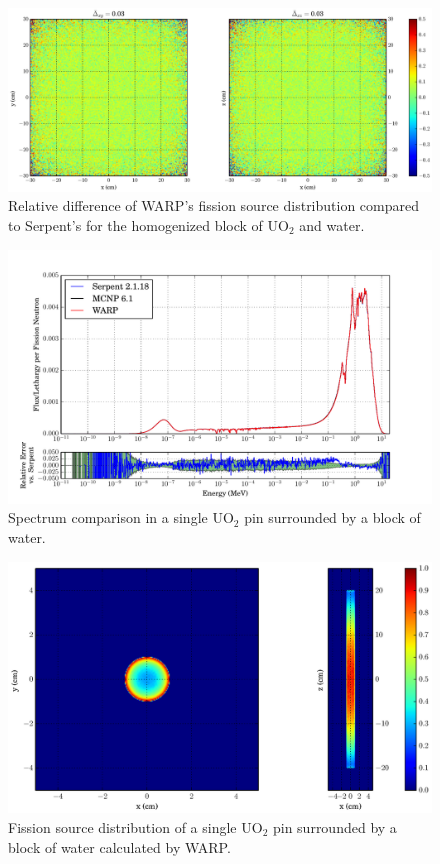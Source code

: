 \begin{figure}[h!]
\centering
\includegraphics[width=\textwidth,trim= 5cm 0cm 7cm 0cm]{graphics/finalresults/homfuel_fiss_diff-6.eps}
\caption{Relative difference of WARP's fission source distribution compared to Serpent's for the homogenized block of UO$_2$ and water. \label{homfuel_fiss_diff} }
\end{figure}

\begin{figure}[h!] 
\centering
\includegraphics[width=\textwidth,trim= 1cm 0cm 1cm 0cm]{graphics/finalresults/pincell_spec-6.pdf}
\caption{Spectrum comparison in a single UO$_2$ pin surrounded by a block of water. \label{pincell_spec} }
\end{figure}

\begin{figure}[h!]
\centering
\includegraphics[width=\textwidth,trim= 11cm 0cm 6cm 0cm]{graphics/finalresults/pincell_fiss-6.eps}
\caption{Fission source distribution of a single UO$_2$ pin surrounded by a block of water calculated by WARP. \label{pincell_fiss} }
\end{figure}

